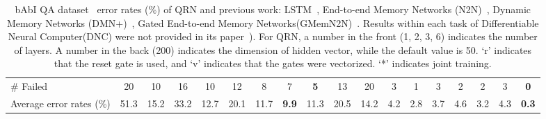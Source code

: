 \documentclass[table]{article}
\begin{document}
\begin{table}[ht]
\begin{center}
{\begin{tabular}{|l||c|c|c|c|c|c|c|c|c|c||c|c|c|c|c|c|c|}
 \hline
 \# Failed                      & 20    & 10    & 16    & 10    & 12    & 8     & 7     &{\bf 5}& 13    &20   & 3     &  1     & 3   & 2     & 2     & 3   &{\bf 0}\\ 
 Average error rates (\%)       & 51.3  & 15.2  & 33.2  & 12.7  & 20.1  & 11.7  &{\bf 9.9}& 11.3  & 20.5  &14.2 & 4.2   & 2.8  & 3.7    & 4.6   & 3.2   & 4.3    &{\bf 0.3}\\
 \hline
\end{tabular}
}
\end{center}
\caption{\small bAbI QA dataset~\citep{babi} error rates (\%) of QRN and previous work: LSTM~\citep{babi}, End-to-end Memory Networks (N2N)~\citep{memN2N}, Dynamic Memory Networks (DMN+)~\citep{DMN+}, Gated End-to-end Memory Networks(GMemN2N)~\citep{perez2016gated}. Results within each task of Differentiable Neural Computer(DNC) were not provided in its paper~\citet{graves2016hybrid}). For QRN, a number in the front (1, 2, 3, 6) indicates the number of layers. A number in the back (200) indicates the dimension of hidden vector, while the default value is 50. `r' indicates that the reset gate is used, and `v' indicates that the gates were vectorized. `*' indicates joint training.}
\label{tab:qa-all}
\end{table}
\end{document}
